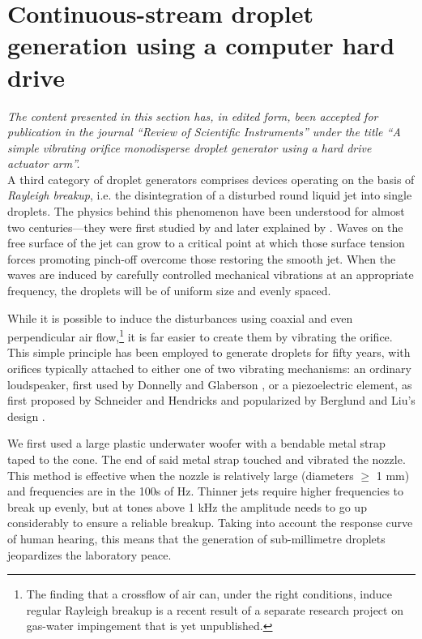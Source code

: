 \documentclass[11.5pt,oneside]{book}
\begin{document}
\section{Continuous-stream droplet generation using a computer hard drive}
\noindent \emph{The content presented in this section has, in edited form,
        been accepted for publication in the journal ``Review of Scientific
        Instruments'' under the title ``A simple vibrating orifice monodisperse
 droplet generator using a hard drive actuator arm''.}\\

A third category of droplet generators comprises devices operating on the basis
of \emph{Rayleigh breakup}, i.e. the disintegration of a disturbed round liquid
jet into single droplets. The physics behind this phenomenon have been
understood for almost two centuries—they were first studied
by \citet{Savart33} and later explained by \citet{Rayleigh79}. Waves on
the free surface of the jet can grow to a critical point at which those surface
tension forces promoting pinch-off overcome those restoring the smooth jet. When
the waves are induced by carefully controlled mechanical vibrations at an
appropriate frequency, the droplets will be of uniform size and evenly spaced.

While it is possible to induce the disturbances using coaxial \cite{Green89} and
even perpendicular air flow,\footnote{The finding that a crossflow of air can,
        under the right conditions, induce regular Rayleigh breakup is a recent
        result of a separate research project on gas-water impingement that is
yet unpublished.} it is far easier to create them by vibrating the orifice.
This simple principle has been employed to generate droplets for fifty years,
with orifices typically attached to either one of two vibrating mechanisms: an
ordinary loudspeaker, first used by Donnelly and Glaberson \cite{Donnelly66}, or
a piezoelectric element, as first proposed by Schneider and
Hendricks \cite{Schneider64} and popularized by Berglund and Liu's
design \cite{Berglund73}. 

We first used a large plastic underwater woofer with a bendable metal strap taped to
the cone. The end of said metal strap touched and vibrated the nozzle. This
method is effective when the nozzle is relatively large (diameters $\geq$ 1 mm)
and frequencies are in the 100s of Hz. Thinner jets require higher frequencies
to break up evenly, but at tones above 1 kHz the amplitude needs to go up
considerably to ensure a reliable breakup. Taking into account the response
curve of human hearing, this means that the generation of sub-millimetre
droplets jeopardizes the laboratory peace.
\end{document}
